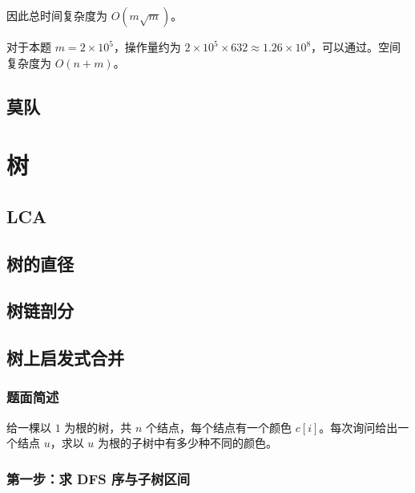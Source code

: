 \documentclass[11pt,a4paper,twocolumn]{ctexart}  %
\begin{document}
因此总时间复杂度为 $O(m\sqrt{m})$。

对于本题 $m = 2 \times 10^5$，操作量约为 $2 \times 10^5 \times 632 \approx 1.26 \times 10^8$，可以通过。空间复杂度为 $O(n + m)$。

\subsection{莫队}


\section{树}
\subsection{LCA}





\subsection{树的直径}



\subsection{树链剖分}

\subsection{树上启发式合并}
\subsubsection*{题面简述}

给一棵以 $1$ 为根的树，共 $n$ 个结点，每个结点有一个颜色 $c[i]$。每次询问给出一个结点 $u$，求以 $u$ 为根的子树中有多少种不同的颜色。

\subsubsection*{第一步：求 DFS 序与子树区间}
\end{document}
